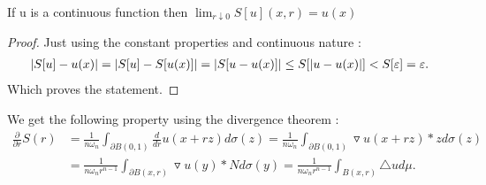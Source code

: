 \begin{lemma}
  If u is a continuous function then $\lim_{r \downarrow 0 } S[u](x,r) = u(x)$ 
\end{lemma}
\begin{proof}[Proof]
  Just using the constant properties and continuous nature : 
  \begin{align*}
    \lvert S[u] - u(x)\rvert = \lvert S[u]-S[u(x)]\rvert = \lvert S[u-u(x)]\rvert \le S[\lvert u-u(x)\rvert] < S[\varepsilon ] = \varepsilon 
  .\end{align*}
  Which proves the statement.
\end{proof}
We get the following property using the divergence theorem : 
\begin{align*}
  \frac{\partial }{\partial r} S(r) &= \frac{1}{n \omega_n} \int_{\partial B(0,1)} \frac{d}{dr} u(x+rz) d\sigma(z) = \frac{1}{n \omega_n} \int_{\partial B(0,1)} \triangledown u (x+rz)*z d\sigma(z) \\ 
                                    &= \frac{1}{n \omega_n r^{n-1 } } \int_{\partial B(x,r)} \triangledown u(y) * N d\sigma(y) = \frac{1}{n \omega_n r^{n-1 } }\int_{B(x,r)} \triangle u d\mu  
.\end{align*}


